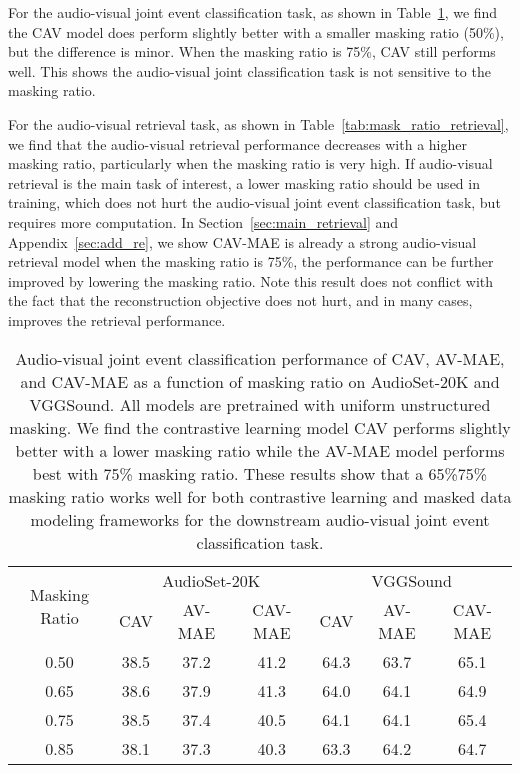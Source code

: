 \documentclass{article} \usepackage{iclr2023_conference,times}
\begin{document}
For the audio-visual joint event classification task, as shown in Table~\ref{tab:mask_ratio}, we find the CAV model does perform slightly better with a smaller masking ratio (50\%), but the difference is minor. When the masking ratio is 75\%, CAV still performs well. This shows the audio-visual joint classification task is not sensitive to the masking ratio.

For the audio-visual retrieval task, as shown in Table~\ref{tab:mask_ratio_retrieval}, we find that the audio-visual retrieval performance decreases with a higher masking ratio, particularly when the masking ratio is very high. If audio-visual retrieval is the main task of interest, a lower masking ratio should be used in training, which does not hurt the audio-visual joint event classification task, but requires more computation. In Section~\ref{sec:main_retrieval} and Appendix~\ref{sec:add_re}, we show CAV-MAE is already a strong audio-visual retrieval model when the masking ratio is 75\%, the performance can be further improved by lowering the masking ratio. Note this result does not conflict with the fact that the reconstruction objective does not hurt, and in many cases, improves the retrieval performance.

\begin{table}[h]
\centering
\caption{Audio-visual joint event classification performance of CAV, AV-MAE, and CAV-MAE as a function of masking ratio on AudioSet-20K and VGGSound. All models are pretrained with uniform unstructured masking. We find the contrastive learning model CAV performs slightly better with a lower masking ratio while the AV-MAE model performs best with 75\% masking ratio. These results show that a 65\%75\% masking ratio works well for both contrastive learning and masked data modeling frameworks for the downstream audio-visual joint event classification task.}
\label{tab:mask_ratio}
\begin{tabular}{@{}ccccccc@{}}
\toprule
\multirow{2}{*}{Masking Ratio} & \multicolumn{3}{c}{AudioSet-20K} & \multicolumn{3}{c}{VGGSound} \\ \cmidrule(l){2-7} 
                               & CAV     & AV-MAE    & CAV-MAE    & CAV    & AV-MAE   & CAV-MAE  \\ \midrule
0.50                           & 38.5    & 37.2      & 41.2       & 64.3   & 63.7     & 65.1     \\
0.65                           & 38.6    & 37.9      & 41.3       & 64.0   & 64.1     & 64.9     \\
0.75                           & 38.5    & 37.4      & 40.5       & 64.1   & 64.1     & 65.4     \\
0.85                           & 38.1    & 37.3      & 40.3       & 63.3   & 64.2     & 64.7     \\ \bottomrule
\end{tabular}
\end{table}
\end{document}
